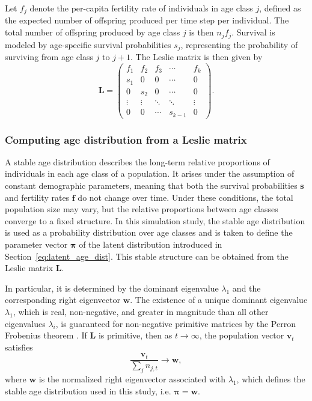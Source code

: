 \documentclass[11pt,a4paper]{article}
\begin{document}
Let $f_j$ denote the per-capita fertility rate of individuals in age class $j$, defined as the expected number of offspring produced per time step per individual. The total number of offspring produced by age class $j$ is then $n_j f_j$. Survival is modeled by age-specific survival probabilities $s_j$, representing the probability of surviving from age class $j$ to $j+1$. The Leslie matrix is then given by
\[
\mathbf{L} =
\begin{pmatrix}
	f_1 & f_2 & f_3 & \cdots & f_k \\
	s_1 & 0   & 0   & \cdots & 0   \\
	0   & s_2 & 0   & \cdots & 0   \\
	\vdots & \vdots & \ddots & \ddots & \vdots \\
	0   & 0   & \cdots & s_{k-1} & 0
\end{pmatrix}.
\]

\subsubsection{Computing age distribution from a Leslie matrix}\label{sec:age_distribution}

A stable age distribution describes the long-term relative proportions of individuals in each age class of a population. It arises under the assumption of constant demographic parameters, meaning that both the survival probabilities $\mathbf{s}$ and fertility rates $\mathbf{f}$ do not change over time. Under these conditions, the total population size may vary, but the relative proportions between age classes converge to a fixed structure. In this simulation study, the stable age distribution is used as a probability distribution over age classes and is taken to define the parameter vector $\boldsymbol{\pi}$ of the latent distribution introduced in Section~\ref{eq:latent_age_dist}. This stable structure can be obtained from the Leslie matrix $\mathbf{L}$.

In particular, it is determined by the dominant eigenvalue $\lambda_1$ and the corresponding right eigenvector $\mathbf{w}$. The existence of a unique dominant eigenvalue $\lambda_1$, which is real, non-negative, and greater in magnitude than all other eigenvalues $\lambda_i$, is guaranteed for non-negative primitive matrices by the Perron Frobenius theorem \parencite{caswell2001}. If $\mathbf{L}$ is primitive, then as $t \rightarrow \infty$, the population vector $\mathbf{v}_t$ satisfies
\[
\frac{\mathbf{v}_t}{\sum_j n_{j,t}} \to \boldsymbol{w},
\]
where $\boldsymbol{w}$ is the normalized right eigenvector associated with $\lambda_1$, which defines the stable age distribution used in this study, i.e. $\boldsymbol{\pi} = \boldsymbol{w}$.
\end{document}
